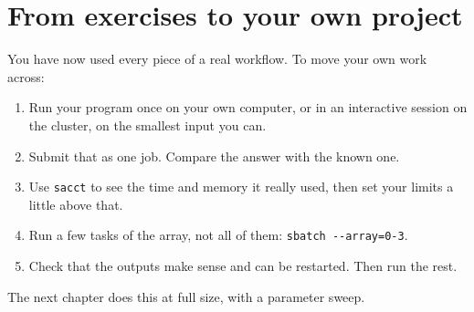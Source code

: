 \section{From exercises to your own project}\label{from-exercises-to-your-own-project}

You have now used every piece of a real workflow. To move your own work across:

\begin{enumerate}
\def\labelenumi{\arabic{enumi}.}
\tightlist
\item
  Run your program once on your own computer, or in an interactive session on the cluster, on the smallest input you can.
\item
  Submit that as one job. Compare the answer with the known one.
\item
  Use \texttt{sacct} to see the time and memory it really used, then set your limits a little above that.
\item
  Run a few tasks of the array, not all of them: \texttt{sbatch\ -\/-array=0-3}.
\item
  Check that the outputs make sense and can be restarted. Then run the rest.
\end{enumerate}

The next chapter does this at full size, with a parameter sweep.

